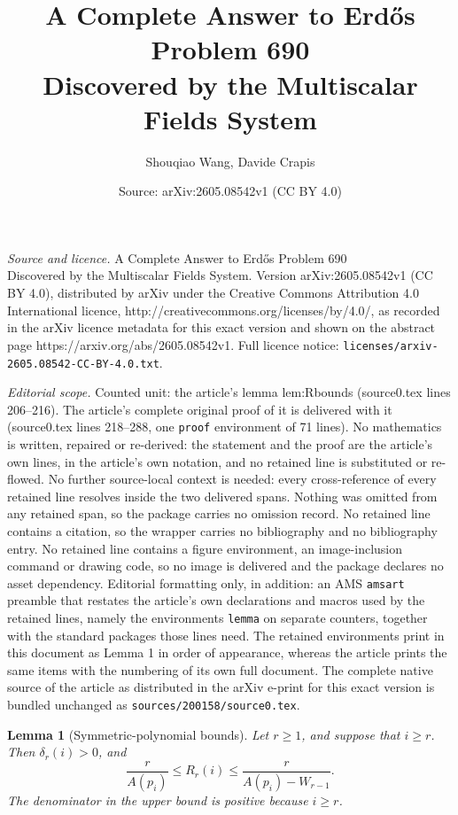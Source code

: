 \documentclass[10pt,a4paper]{amsart}
\title{A Complete Answer to Erdős Problem 690\\ {\large Discovered by the Multiscalar Fields System}}
\author{Shouqiao Wang, Davide Crapis}
\date{Source: arXiv:2605.08542v1 (CC BY 4.0)}
\newtheorem{lemma}{Lemma}
\begin{document}
\maketitle

\noindent\emph{Source and licence.} A Complete Answer to Erdős Problem 690\\ {\large Discovered by the Multiscalar Fields System}. Version arXiv:2605.08542v1 (CC BY 4.0), distributed by arXiv under the Creative Commons Attribution 4.0 International licence, http://creativecommons.org/licenses/by/4.0/, as recorded in the arXiv licence metadata for this exact version and shown on the abstract page https://arxiv.org/abs/2605.08542v1. Full licence notice: \texttt{licenses/arxiv-2605.08542-CC-BY-4.0.txt}.\par\smallskip

\noindent\textit{Editorial scope.} Counted unit: the article's lemma lem:Rbounds (source0.tex lines 206--216). The article's complete original proof of it is delivered with it (source0.tex lines 218--288, one \texttt{proof} environment of 71 lines). No mathematics is written, repaired or re-derived: the statement and the proof are the article's own lines, in the article's own notation, and no retained line is substituted or re-flowed.  No further source-local context is needed: every cross-reference of every retained line resolves inside the two delivered spans.  Nothing was omitted from any retained span, so the package carries no omission record.  No retained line contains a citation, so the wrapper carries no bibliography and no bibliography entry.  No retained line contains a figure environment, an image-inclusion command or drawing code, so no image is delivered and the package declares no asset dependency.  Editorial formatting only, in addition: an AMS \texttt{amsart} preamble that restates the article's own declarations and macros used by the retained lines, namely the environments \texttt{lemma} on separate counters, together with the standard packages those lines need.  The retained environments print in this document as Lemma 1 in order of appearance, whereas the article prints the same items with the numbering of its own full document.  The complete native source of the article as distributed in the arXiv e-print for this exact version is bundled unchanged as \texttt{sources/200158/source0.tex}.
\begin{lemma}[Symmetric-polynomial bounds]\label{lem:Rbounds}
Let \(r\ge 1\), and suppose that \(i\ge r\).  Then \(\delta_r(i)>0\), and
\[
        \frac r{A(p_i)}
        \le
        R_r(i)
        \le
        \frac r{A(p_i)-W_{r-1}} .
\]
The denominator in the upper bound is positive because \(i\ge r\).
\end{lemma}
\end{document}
